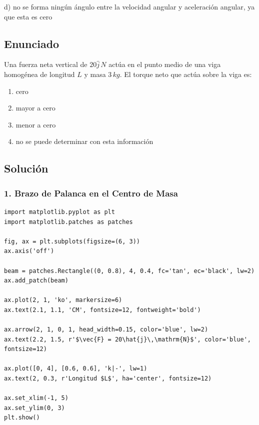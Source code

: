\documentclass[12pt, a4paper]{article}
\begin{document}
\begin{tcolorbox}[colback=green!5!white, colframe=green!50!black, title=Respuesta Final]
\centering \Large d) no se forma ningún ángulo entre la velocidad angular y aceleración angular, ya que esta es cero
\end{tcolorbox}

\newpage

\subsection*{Enunciado}
Una fuerza neta vertical de $20\hat{j}\,\si{N}$ actúa en el punto medio de una viga homogénea de longitud $L$ y masa $3\,\si{kg}$. El torque neto que actúa sobre la viga es:
\begin{enumerate}[label=\alph*)]
    \item cero
    \item mayor a cero
    \item menor a cero
    \item no se puede determinar con esta información
\end{enumerate}

\subsection*{Solución}

\subsubsection*{1. Brazo de Palanca en el Centro de Masa}

\begin{verbatim}
import matplotlib.pyplot as plt
import matplotlib.patches as patches

fig, ax = plt.subplots(figsize=(6, 3))
ax.axis('off')

beam = patches.Rectangle((0, 0.8), 4, 0.4, fc='tan', ec='black', lw=2)
ax.add_patch(beam)

ax.plot(2, 1, 'ko', markersize=6)
ax.text(2.1, 1.1, 'CM', fontsize=12, fontweight='bold')

ax.arrow(2, 1, 0, 1, head_width=0.15, color='blue', lw=2)
ax.text(2.2, 1.5, r'$\vec{F} = 20\hat{j}\,\mathrm{N}$', color='blue', fontsize=12)

ax.plot([0, 4], [0.6, 0.6], 'k|-', lw=1)
ax.text(2, 0.3, r'Longitud $L$', ha='center', fontsize=12)

ax.set_xlim(-1, 5)
ax.set_ylim(0, 3)
plt.show()
\end{verbatim}
\end{document}
